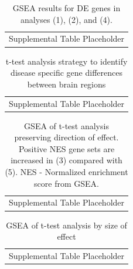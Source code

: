 \documentclass[fleqn,10pt,table]{wlscirep}
\begin{document}
\begin{table}[ht]
    \centering
    \begin{tabular}{c}
    Supplemental Table Placeholder
    \end{tabular}
    \caption{GSEA results for DE genes in analyses (1), (2), and (4).}
    \label{tab:supp_de_gsea}
\end{table}

\begin{table}[ht]
    \centering
    \begin{tabular}{c}
    Supplemental Table Placeholder
    \end{tabular}
    \caption{t-test analysis strategy to identify disease specific gene differences between brain regions}
    \label{tab:supp_ttest}
\end{table}

\begin{table}[ht]
    \centering
    \begin{tabular}{c}
    Supplemental Table Placeholder
    \end{tabular}
    \caption{GSEA of t-test analysis preserving direction of effect. Positive NES gene sets are increased in (3) compared with (5). NES - Normalized enrichment score from GSEA.}
    \label{tab:supp_ttest_direct_gsea}
\end{table}

\begin{table}[ht]
    \centering
    \begin{tabular}{c}
    Supplemental Table Placeholder
    \end{tabular}
    \caption{GSEA of t-test analysis by size of effect}
    \label{tab:supp_ttest_effect_gsea}
\end{table}
\end{document}
